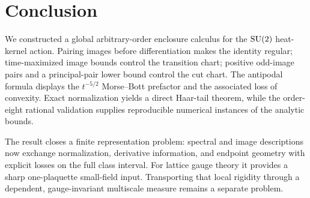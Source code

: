 \section{Conclusion}

We constructed a global arbitrary-order enclosure calculus for the $\mathrm{SU}(2)$
heat-kernel action.  Pairing images before differentiation makes the identity
regular; time-maximized image bounds control the transition chart; positive
odd-image pairs and a principal-pair lower bound control the cut chart.  The
antipodal formula displays the $t^{-5/2}$ Morse--Bott prefactor and the
associated loss of convexity.  Exact normalization yields a direct Haar-tail
theorem, while the order-eight rational validation supplies reproducible
numerical instances of the analytic bounds.

The result closes a finite representation problem: spectral and image
descriptions now exchange normalization, derivative information, and endpoint
geometry with explicit losses on the full class interval.  For lattice gauge
theory it provides a sharp one-plaquette small-field input.  Transporting that
local rigidity through a dependent, gauge-invariant multiscale measure
remains a separate problem.
